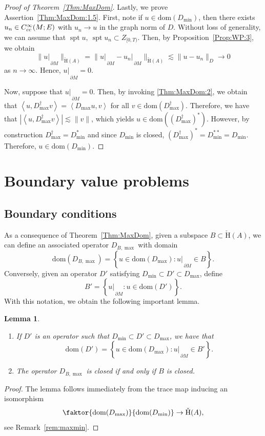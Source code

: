 \documentclass[a4paper,10pt,reqno]{amsart}
\newcommand{\rest}[1]{{{\lvert_{}}_{}}_{#1}}
\newcommand{\dbrac}[1]{\left\{#1\right\}}
\newcommand{\modulus}[1]{|#1|}
\newcommand{\norm}[1]{\| #1 \|}%
\newcommand{\set}[1]{\dbrac{#1}}
\newcommand{\Ck}[2][{}]{{\rm C}^{#2}_{\rm #1}}%
\newcommand{\checkH}{\check{\mathrm{H}}}
\newcommand{\dom}{\mathrm{dom}}
\DeclareMathOperator{\spt}{spt}%
\newcommand{\inprod}[1]{\left\langle #1 \right\rangle}%
\newcommand{\dM}{\partial M}
\newtheorem{lemma}[theorem]{Lemma}
\theoremstyle{definition}
\begin{document}
\begin{proof}[Proof of Theorem~\ref{Thm:MaxDom}]
Lastly, we prove  Assertion~\ref{Thm:MaxDom:1.5}.
First, note  if $u \in \dom(D_{\min})$, then there exists $u_n \in \Ck[cc]{\infty}(M;E)$ with $u_n \to u$ in the graph norm of $D$.
Without loss of generality, we can assume that $\spt u,\ \spt u_n \subset Z_{[0,T)}$.
Then, by Proposition~\ref{Prop:WP:3}, we obtain
$$\norm{u\rest{\dM}}_{\checkH(A)} = \norm{u\rest{\dM} - u_n\rest{\dM}}_{\checkH(A)} \lesssim \norm{u - u_n}_{D} \to 0$$
as $n \to \infty$.
Hence, $u \rest{\dM} = 0$.

Now, suppose that $u\rest{\dM} = 0$.
Then, by invoking \ref{Thm:MaxDom:2}, we obtain that $\inprod{u, D_{\max}^{\dagger} v}  = \inprod{D_{\max} u,v}$ for all $v \in \dom(D_{\max}^\dagger)$.
Therefore, we have that $\modulus{\inprod{u, D_{\max}^\dagger v}} \lesssim \norm{v}$, which yields $u \in \dom((D_{\max}^\dagger)^\ast)$.
However, by construction $D_{\max}^\dagger = D_{\min}^\ast$ and since $D_{\min}$ is closed, $(D_{\max}^\dagger)^\ast = D_{\min}^{\ast\ast} = D_{\min}$.
Therefore, $u \in \dom(D_{\min})$.
\end{proof}



\section{Boundary value problems}
\label{Sec:BVPs}

\subsection{Boundary conditions}
As a consequence of Theorem~\ref{Thm:MaxDom}, given a subspace $B \subset \checkH(A)$, we can define an associated operator $D_{B,\max}$ with domain  $$\dom(D_{B,\max}) = \set{u \in \dom(D_{\max}): u\rest{\dM} \in B}.$$
Conversely, given an operator $D'$ satisfying $D_{\min} \subset D' \subset D_{\max}$, define
$$B' = \set{u\rest{\dM}: u \in \dom(D')}.$$
With this notation, we obtain the following important lemma.

\begin{lemma}
\label{Lem:OpBdy}
\begin{enumerate}[label=(\roman*), labelwidth=0pt, labelindent=2pt, leftmargin=21pt]
\item \label{Lem:OpBdy:1}
      If $D'$ is an operator such that $D_{\min} \subset D' \subset D_{\max}$, we have that
      $$\dom(D') = \set{u \in \dom(D_{\max}): u\rest{\dM} \in B'}.$$
\item \label{Lem:OpBdy:2}
      The operator $D_{B,\max}$ is closed if and only if $B$ is closed.
\end{enumerate}
\end{lemma}
\begin{proof}
The lemma follows immediately from the trace map inducing an isomorphism
\begin{equation*}
\faktor{\dom(D_{\max})}{\dom(D_{\min})} \to \checkH(A),
\end{equation*}
see Remark~\ref{rem:maxmin}.
\end{proof}
\end{document}

